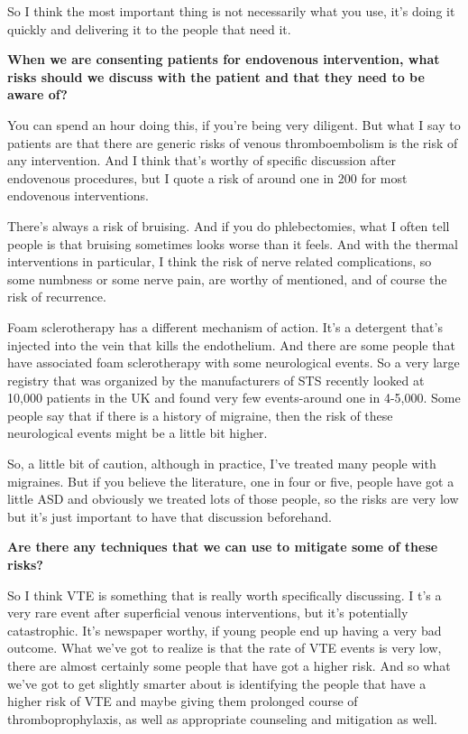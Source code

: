 \documentclass[
]{book}
\begin{document}
So I think the most important thing is not necessarily what you use,
it's doing it quickly and delivering it to the people that need it.

\textbf{When we are consenting patients for endovenous intervention, what
risks should we discuss with the patient and that they need to be aware
of?}

You can spend an hour doing this, if you're being very diligent. But
what I say to patients are that there are generic risks of venous
thromboembolism is the risk of any intervention. And I think that's
worthy of specific discussion after endovenous procedures, but I quote a
risk of around one in 200 for most endovenous interventions.

There's always a risk of bruising. And if you do phlebectomies, what I
often tell people is that bruising sometimes looks worse than it feels.
And with the thermal interventions in particular, I think the risk of
nerve related complications, so some numbness or some nerve pain, are
worthy of mentioned, and of course the risk of recurrence.

Foam sclerotherapy has a different mechanism of action. It's a detergent
that's injected into the vein that kills the endothelium. And there are
some people that have associated foam sclerotherapy with some
neurological events. So a very large registry that was organized by the
manufacturers of STS recently looked at 10,000 patients in the UK and
found very few events-around one in 4-5,000. Some people say that if
there is a history of migraine, then the risk of these neurological
events might be a little bit higher.

So, a little bit of caution, although in practice, I've treated many
people with migraines. But if you believe the literature, one in four or
five, people have got a little ASD and obviously we treated lots of
those people, so the risks are very low but it's just important to have
that discussion beforehand.

\textbf{Are there any techniques that we can use to mitigate some of these
risks?}

So I think VTE is something that is really worth specifically
discussing. I t's a very rare event after superficial venous
interventions, but it's potentially catastrophic. It's newspaper worthy,
if young people end up having a very bad outcome. What we've got to
realize is that the rate of VTE events is very low, there are almost
certainly some people that have got a higher risk. And so what we've got
to get slightly smarter about is identifying the people that have a
higher risk of VTE and maybe giving them prolonged course of
thromboprophylaxis, as well as appropriate counseling and mitigation as
well.
\end{document}
